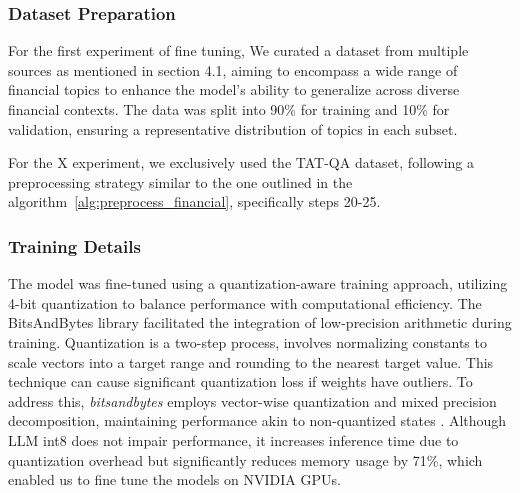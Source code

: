\documentclass[logo,msc]{infthesis}           %
\begin{document}
\subsubsection*{Dataset Preparation} For the first experiment of fine tuning, We curated a dataset from multiple sources as mentioned in section 4.1, aiming to encompass a wide range of financial topics to enhance the model's ability to generalize across diverse financial contexts. The data was split into 90\% for training and 10\% for validation, ensuring a representative distribution of topics in each subset.

For the X experiment, we exclusively used the TAT-QA dataset, following a preprocessing strategy similar to the one outlined in the algorithm~\ref{alg:preprocess_financial}, specifically steps 20-25.

\subsubsection*{Training Details}
The model was fine-tuned using a quantization-aware training approach, utilizing 4-bit quantization to balance performance with computational efficiency. The BitsAndBytes library facilitated the integration of low-precision arithmetic during training. Quantization is a two-step process, involves normalizing constants to scale vectors into a target range and rounding to the nearest target value. This technique can cause significant quantization loss if weights have outliers. To address this, \textit{bitsandbytes} employs vector-wise quantization and mixed precision decomposition, maintaining performance akin to non-quantized states \cite{j2024finetuningllmenterprise}. Although LLM int8 does not impair performance, it increases inference time due to quantization overhead but significantly reduces memory usage by 71\%, which enabled us to fine tune the models on NVIDIA GPUs.
\end{document}
